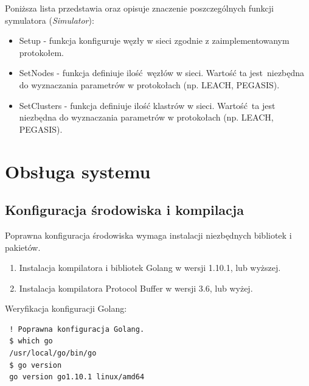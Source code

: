 \documentclass[a4paper,12pt,twoside,openany]{report}
\begin{document}
Poniższa lista przedstawia oraz opisuje znaczenie poszczególnych funkcji symulatora (\textit{Simulator}):

\begin{itemize}
 \item Setup - funkcja konfiguruje węzły w sieci zgodnie z zaimplementowanym protokołem.
 \item SetNodes - funkcja definiuje ilość węzłów w sieci. Wartość ta jest niezbędna do wyznaczania parametrów w protokołach (np. LEACH, PEGASIS).
 \item SetClusters - funkcja definiuje ilość klastrów w sieci. Wartość ta jest niezbędna do wyznaczania parametrów w protokołach (np. LEACH, PEGASIS).
\end{itemize}



\section{Obsługa systemu}
 
\subsection{Konfiguracja środowiska i kompilacja}

Poprawna konfiguracja środowiska wymaga instalacji niezbędnych bibliotek i pakietów.

\begin{enumerate}
 \item Instalacja kompilatora i bibliotek Golang w wersji 1.10.1, lub wyższej.
 \item Instalacja kompilatora Protocol Buffer w wersji 3.6, lub wyżej.
\end{enumerate}

Weryfikacja konfiguracji Golang:

\begin{lstlisting}
 ! Poprawna konfiguracja Golang.
 $ which go
 /usr/local/go/bin/go
 $ go version
 go version go1.10.1 linux/amd64
\end{lstlisting}
\end{document}
